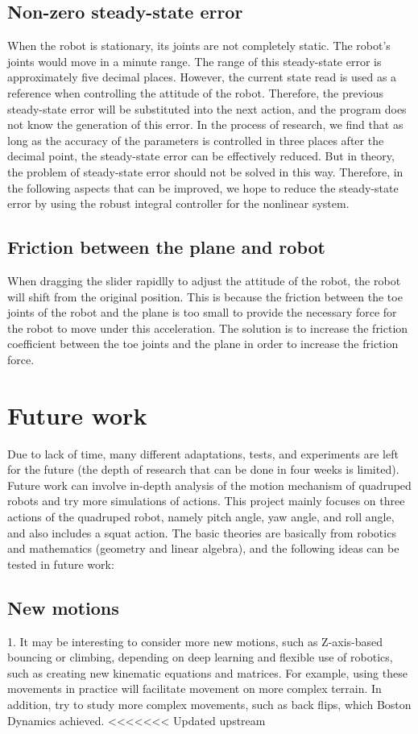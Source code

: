 \subsection{Non-zero steady-state error}
When the robot is stationary, its joints are not completely static. The robot's joints would move in a minute range. The range of this steady-state error is approximately five decimal places. However, the current state read is used as a reference when controlling the attitude of the robot. Therefore, the previous steady-state error will be substituted into the next action, and the program does not know the generation of this error. In the process of research, we find that as long as the accuracy of the parameters is controlled in three places after the decimal point, the steady-state error can be effectively reduced. But in theory, the problem of steady-state error should not be solved in this way. Therefore, in the following aspects that can be improved, we hope to reduce the steady-state error by using the robust integral controller\cite{ref:RNIcontrol} for the nonlinear system.

\subsection{Friction between the plane and robot}
When dragging the slider rapidlly to adjust the attitude of the robot, the robot will shift from the original position. This is because the friction between the toe joints of the robot and the plane is too small to provide the necessary force for the robot to move under this acceleration. The solution is to increase the friction coefficient between the toe joints and the plane in order to increase the friction force.


\section{Future work}
Due to lack of time, many different adaptations, tests, and experiments are left for the future (the depth of research that can be done in four weeks is limited). Future work can involve in-depth analysis of the motion mechanism of quadruped robots and try more simulations of actions.
This project mainly focuses on three actions of the quadruped robot, namely pitch angle, yaw angle, and roll angle, and also includes a squat action. The basic theories are basically from robotics and mathematics (geometry and linear algebra), and the following ideas can be tested in future work:
\subsection{New motions}
1. It may be interesting to consider more new motions, such as Z-axis-based bouncing or climbing, depending on deep learning and flexible use of robotics, such as creating new kinematic equations and matrices. For example, using these movements in practice will facilitate movement on more complex terrain. In addition, try to study more complex movements, such as back flips, which Boston Dynamics achieved.
<<<<<<< Updated upstream
